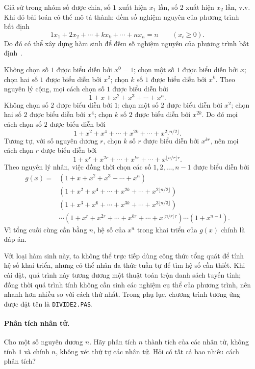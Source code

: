 \documentclass[11pt]{article}
\begin{document}
Giả sử trong nhóm số được chia, số \(1\) xuất hiện \(x_1\) lần, số \(2\) xuất
hiện \(x_2\) lần, v.v. Khi đó bài toán có thể mô tả thành: đếm số nghiệm
nguyên của phương trình bất định
\[
  1x_1+2x_2+\cdots+kx_k+\cdots+nx_n=n
  \qquad (x_i\ge 0).
\]
Do đó có thể xây dựng hàm sinh để đếm số nghiệm nguyên của phương trình bất
định~\cite{combinatorics}.

Không chọn số \(1\) được biểu diễn bởi \(x^0=1\); chọn một số \(1\) được biểu
diễn bởi \(x\); chọn hai số \(1\) được biểu diễn bởi \(x^2\); chọn \(k\) số
\(1\) được biểu diễn bởi \(x^k\). Theo nguyên lý cộng, mọi cách chọn số \(1\)
được biểu diễn bởi
\[
  1+x+x^2+x^3+\cdots+x^n.
\]
Không chọn số \(2\) được biểu diễn bởi \(1\); chọn một số \(2\) được biểu diễn
bởi \(x^2\); chọn hai số \(2\) được biểu diễn bởi \(x^4\); chọn \(k\) số \(2\)
được biểu diễn bởi \(x^{2k}\). Do đó mọi cách chọn số \(2\) được biểu diễn
bởi
\[
  1+x^2+x^4+\cdots+x^{2k}+\cdots+x^{2\lfloor n/2\rfloor}.
\]
Tương tự, với số nguyên dương \(r\), chọn \(k\) số \(r\) được biểu diễn bởi
\(x^{kr}\), nên mọi cách chọn \(r\) được biểu diễn bởi
\[
  1+x^r+x^{2r}+\cdots+x^{kr}+\cdots+x^{\lfloor n/r\rfloor r}.
\]
Theo nguyên lý nhân, việc đồng thời chọn các số \(1,2,\ldots,n-1\) được biểu
diễn bởi
\[
\begin{aligned}
g(x)=&(1+x+x^2+x^3+\cdots+x^n)\\
&(1+x^2+x^4+\cdots+x^{2k}+\cdots+x^{2\lfloor n/2\rfloor})\\
&(1+x^3+x^6+\cdots+x^{3k}+\cdots+x^{3\lfloor n/3\rfloor})\\
&\cdots
(1+x^r+x^{2r}+\cdots+x^{kr}+\cdots+x^{\lfloor n/r\rfloor r})
\cdots(1+x^{n-1}).
\end{aligned}
\]
Vì tổng cuối cùng cần bằng \(n\), hệ số của \(x^n\) trong khai triển của
\(g(x)\) chính là đáp án.

Với loại hàm sinh này, ta không thể trực tiếp dùng công thức tổng quát để
tính hệ số khai triển, nhưng có thể nhân đa thức tuần tự để tìm hệ số cần
thiết. Khi cài đặt, quá trình này tương đương một thuật toán trộn danh sách
tuyến tính; đồng thời quá trình tính không cần sinh các nghiệm cụ thể của
phương trình, nên nhanh hơn nhiều so với cách thứ nhất. Trong phụ lục, chương
trình tương ứng được đặt tên là \texttt{DIVIDE2.PAS}.

\paragraph{Phân tích nhân tử.}
Cho một số nguyên dương \(n\). Hãy phân tích \(n\) thành tích của các nhân tử,
không tính \(1\) và chính \(n\), không xét thứ tự các nhân tử. Hỏi có tất cả
bao nhiêu cách phân tích?
\end{document}
